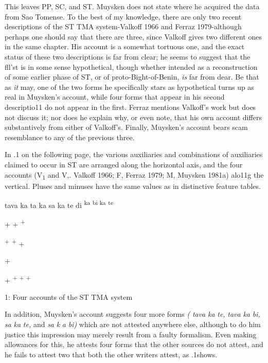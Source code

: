 This leaves PP, SC, and ST. Muysken does not state where he acquired the data from Sao Tomense. To the best of my knowledge, there are only two recent descriptions of the ST TMA system-Valkoff 1966 and Ferraz 1979-although perhaps one should say that there are three, since Valkoff gives two different ones in the same chapter. His account is a somewhat tortuous one, and the exact status of these two descriptions is far from clear; he seems to suggest that the fll'st is in some sense hypothetical, though whether intended as a reconstruc\-tion of some earlier phase of ST, or of proto-Bight-of-Benin, \textit{is} far from dear. Be that as \textit{it} may, one of the two forms he specifically stars as hypothetical turns up as real in Muysken's account, while four forms that appear in his second descriptio11 do not appear in the first. Ferraz mentions Valkoff's work but does not discuss it; nor does he explain why, or even note, that his own account differs substantively from either of Valkoff's. Finally, Muysken's account bears scam resemblance to any of the previous three.

In .1 on the following page, the various auxiliaries and combinations of auxiliaries claimed to occur in ST are arranged along the horizontal axis, and the four accounts (V\textsubscript{1}\textsubscript{ }and V,. Valkoff 1966; F, Ferraz 1979; M, Muysken 1981a) alo11g the vertical. Pluses and minuses have the same values as in distinctive feature tables.

  


 


  


    

\begin{table}
tava ka ta ka sa ka te di \textsuperscript{ka} \textsuperscript{bi ka} \textsuperscript{te}

+ + \textsuperscript{+}

\textsuperscript{+ }\textsuperscript{+ }+

+

+ \textsuperscript{+ + +}

\caption{1: Four accounts of the ST TMA system}
\label{tab:2}
\end{table}

In addition, Muysken's account suggests four more forms \textit{(} \textit{tava} \textit{ka} \textit{te,} \textit{tava} \textit{ka} \textit{bi,} \textit{sa} \textit{ka} \textit{te,} and \textit{sa} \textit{k} \textit{a} \textit{bi}\textit{)} which are not attested anywhere else, although to do him justice this impression may merely result from a faulty formalism. Even making allowances for this, he attests four forms that the other sources do not attest, and he fails to attest two that both the other writers attest, as .1shows.

